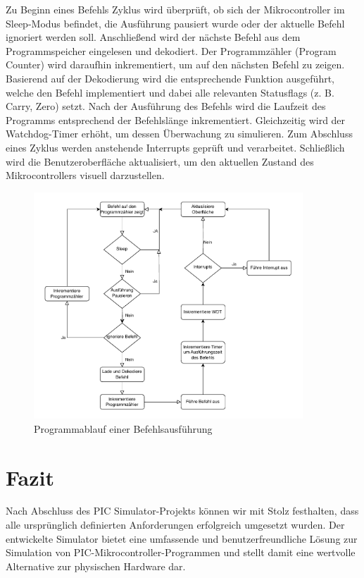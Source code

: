 \documentclass[a4paper,11pt]{report}
\begin{document}
Zu Beginn eines Befehls Zyklus wird überprüft, ob sich der Mikrocontroller im Sleep-Modus befindet, die Ausführung pausiert wurde oder der aktuelle Befehl ignoriert werden soll. Anschließend wird der nächste Befehl aus dem Programmspeicher eingelesen und dekodiert. Der Programmzähler (Program Counter) wird daraufhin inkrementiert, um auf den nächsten Befehl zu zeigen. Basierend auf der Dekodierung wird die entsprechende Funktion ausgeführt, welche den Befehl implementiert und dabei alle relevanten Statusflags (z. B. Carry, Zero) setzt. Nach der Ausführung des Befehls wird die Laufzeit des Programms entsprechend der Befehlslänge inkrementiert. Gleichzeitig wird der Watchdog-Timer erhöht, um dessen Überwachung zu simulieren. Zum Abschluss eines Zyklus werden anstehende Interrupts geprüft und verarbeitet. Schließlich wird die Benutzeroberfläche aktualisiert, um den aktuellen Zustand des Mikrocontrollers visuell darzustellen.

\begin{figure}[h!]
    \centering
    \includegraphics[width=0.9\textwidth]{./img/excec_cycle.drawio.pdf}
    \caption{Programmablauf einer Befehlsausführung}
    \label{fig:execTask}
\end{figure}






\chapter{Fazit}

Nach Abschluss des PIC Simulator-Projekts können wir mit Stolz festhalten, dass alle ursprünglich definierten Anforderungen erfolgreich umgesetzt wurden. Der entwickelte Simulator bietet eine umfassende und benutzerfreundliche Lösung zur Simulation von PIC-Mikrocontroller-Programmen und stellt damit eine wertvolle Alternative zur physischen Hardware dar.
\end{document}
